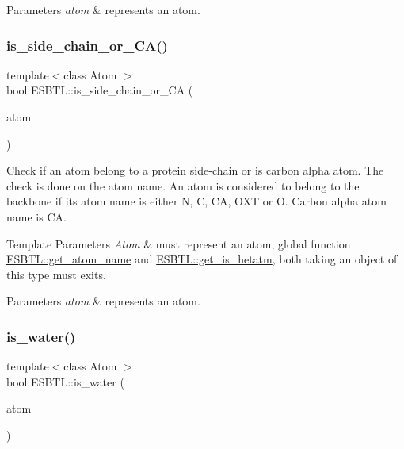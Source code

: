 \begin{DoxyParams}{Parameters}
{\em atom} & represents an atom. \\
\hline
\end{DoxyParams}
\mbox{\label{namespaceESBTL_a117981ffccc18137b919af5c47a51b0d}} 
\subsubsection{\texorpdfstring{is\+\_\+side\+\_\+chain\+\_\+or\+\_\+\+C\+A()}{is\_side\_chain\_or\_CA()}}
{\footnotesize\ttfamily template$<$class Atom $>$ \\
bool E\+S\+B\+T\+L\+::is\+\_\+side\+\_\+chain\+\_\+or\+\_\+\+CA (\begin{DoxyParamCaption}\item[{const Atom \&}]{atom }\end{DoxyParamCaption})}

Check if an atom belong to a protein side-\/chain or is carbon alpha atom. The check is done on the atom name. An atom is considered to belong to the backbone if its atom name is either {\ttfamily N}, {\ttfamily C}, {\ttfamily CA}, {\ttfamily O\+XT} or {\ttfamily O}. Carbon alpha atom name is {\ttfamily CA}. 
\begin{DoxyTemplParams}{Template Parameters}
{\em Atom} & must represent an atom, global function \hyperlink{namespaceESBTL_a2a0153bcc07ae7f992d0087ea0574b2a}{E\+S\+B\+T\+L\+::get\+\_\+atom\+\_\+name} and \hyperlink{namespaceESBTL_a5127b779bbb76916a99d85f2ae7d5ff8}{E\+S\+B\+T\+L\+::get\+\_\+is\+\_\+hetatm}, both taking an object of this type must exits. \\
\hline
\end{DoxyTemplParams}

\begin{DoxyParams}{Parameters}
{\em atom} & represents an atom. \\
\hline
\end{DoxyParams}
\mbox{\label{namespaceESBTL_aa590c02ea198fef7fbdcf2dfbadb1223}} 
\subsubsection{\texorpdfstring{is\+\_\+water()}{is\_water()}}
{\footnotesize\ttfamily template$<$class Atom $>$ \\
bool E\+S\+B\+T\+L\+::is\+\_\+water (\begin{DoxyParamCaption}\item[{const Atom \&}]{atom }\end{DoxyParamCaption})}

